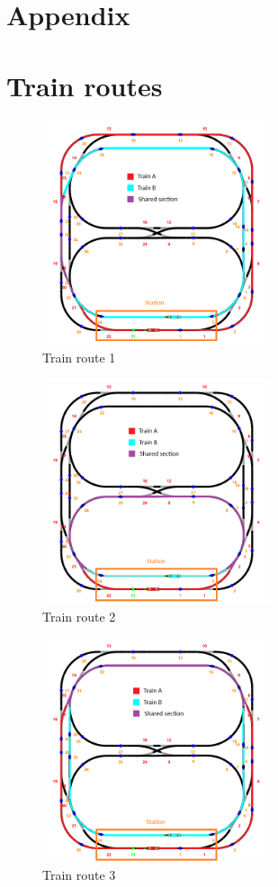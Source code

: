 \documentclass{article}
\begin{document}
    \newpage


    \section*{Appendix}
    \section{Train routes}
    \begin{figure}[!htb]
        \centering
        \includegraphics[width=0.6\textwidth]{./doc/assets/Route_1}
        \caption{Train route 1}
    \end{figure}
    \begin{figure}[!htb]
        \centering
        \includegraphics[width=0.6\textwidth]{./doc/assets/Route_2}
        \caption{Train route 2}
    \end{figure}
        \begin{figure}[!htb]
        \centering
        \includegraphics[width=0.6\textwidth]{./doc/assets/Route_3}
        \caption{Train route 3}
    \end{figure}
\end{document}

